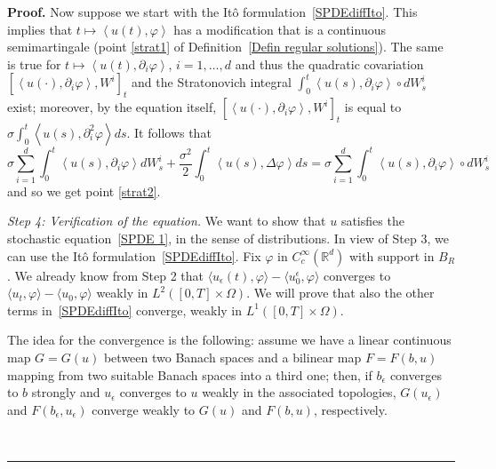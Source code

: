 \documentclass[a4paper,10pt]{article}
\newenvironment{proof}[1][Proof]{\noindent\textbf{#1.} }{\ \rule{0.5em}{0.5em}}
\newcommand{\mr}{\mathbb{R}}
\newcommand{\lan}{\langle}
\newcommand{\ran}{\rangle}
\newcommand{\eps}{\epsilon}
\begin{document}
\begin{proof}
Now suppose we start with the It\^o formulation~\eqref{SPDEdiffIto}.
This implies that $t\mapsto\left\langle u(  t)  ,\varphi
\right\rangle $ has a modification that is a continuous semimartingale (point \ref{strat1} of Definition~\ref{Defin regular solutions}). The
same is true for $t\mapsto\left\langle u(  t)  ,\partial_{i} 
\varphi\right\rangle $, $i=1,\ldots,d$ and thus the quadratic covariation
$[  \left\langle u(  \cdot)  ,\partial_{i}\varphi\right\rangle
,W^{i}]  _{t}$ and the Stratonovich integral $\int_{0}^{t}\left\langle
u(  s)  ,\partial_{i}\varphi\right\rangle \circ dW_{s}^{i}$ exist;
moreover, by the equation itself, $[  \left\langle u(  \cdot)
,\partial_{i}\varphi\right\rangle ,W^{i}]  _{t}$ is equal to $\sigma
\int_{0}^{t}\left\langle u(  s)  ,\partial_{i}^{2}\varphi
\right\rangle ds$. It follows that
\[
\sigma\sum_{i=1}^{d}\int_{0}^{t}\left\langle u(  s)  ,\partial
_{i}\varphi\right\rangle dW_{s}^{i}+\frac{\sigma^{2}}{2}\int_{0} 
^{t}\left\langle u(  s)  ,\Delta\varphi\right\rangle
ds=\sigma\sum_{i=1}^{d}\int_{0}^{t}\left\langle u(  s)
,\partial_{i}\varphi\right\rangle \circ dW_{s}^{i}
\]
and so we get point \ref{strat2}.

\emph{Step 4: Verification of the equation.} We want to show that $u$ satisfies the stochastic equation~\eqref{SPDE 1}, in the sense of distributions. In view of Step 3, we can use the It\^o formulation~\eqref{SPDEdiffIto}. Fix $\varphi$ in $C^\infty_c(\mr^d)$ with support in $B_R$. We already know from Step 2 that $\lan u_\eps(t),\varphi\ran-\lan u^\eps_0,\varphi\ran$ converges to $\lan u_t,\varphi\ran-\lan u_0,\varphi\ran$ weakly in $L^2([0,T]\times\Omega)$. We will prove that also the other terms in~\eqref{SPDEdiffIto} converge, weakly in $L^1([0,T]\times\Omega)$.

The idea for the convergence is the following: assume we have a linear continuous map $G=G(u)$ between two Banach spaces and a bilinear map $F=F(b,u)$ mapping from two suitable Banach spaces into a third one; then, if $b_\eps$ converges to $b$ strongly and $u_\eps$ converges to $u$ weakly in the associated topologies, $G(u_\eps)$ and $F(b_\eps,u_\eps)$ converge weakly to $G(u)$ and $F(b,u)$, respectively.


\end{proof}
\end{document}
